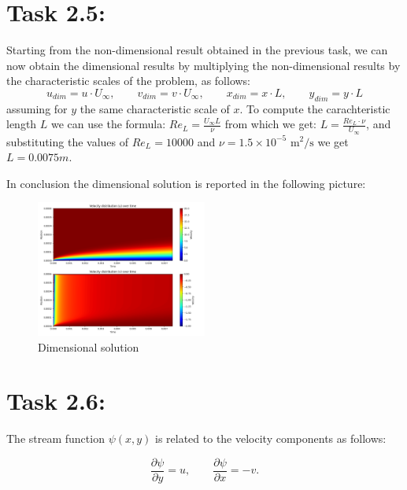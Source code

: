 \section*{\Large Task 2.5:}
Starting from the non-dimensional result obtained in the previous task, we can now obtain the dimensional results by multiplying the non-dimensional results by the characteristic scales of the problem, as follows:
\[
u_{dim} = u \cdot U_{\infty}, \qquad v_{dim} = v \cdot U_{\infty}, \qquad x_{dim} = x \cdot L, \qquad y_{dim} = y \cdot L
\]
assuming for $y$ the same characteristic scale of $x$.
To compute the carachteristic length $L$ we can use the formula: $Re_L = \frac{U_{\infty} L}{\nu}$
from which we get: $L = \frac{Re_L \cdot \nu}{U_{\infty}}$, and substituting the values of $Re_L = 10000$ and $\nu = 1.5 \times 10^{-5} \text{ m}^2/\text{s}$ we get $L = 0.0075 m$.

In conclusion the dimensional solution is reported in the following picture:
\begin{figure}[h]
  \centering
  \includegraphics[width=0.5\textwidth]{result2.png}
  \caption{Dimensional solution}
\end{figure}

\section*{\Large Task 2.6:}
The stream function $\psi(x, y)$ is related to the velocity components as follows:

\begin{equation}
\frac{\partial \psi}{\partial y} = u, \qquad \frac{\partial \psi}{\partial x} = -v.
\end{equation}


